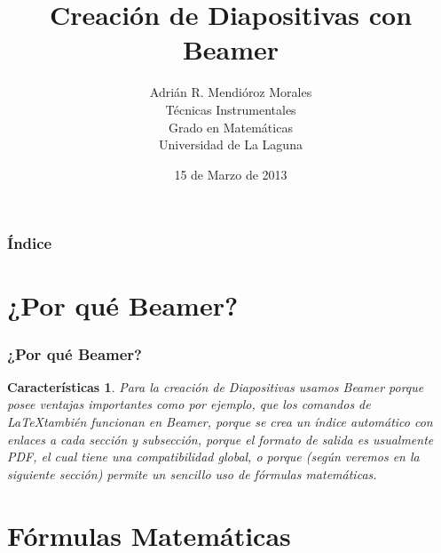 \documentclass{beamer}
\title[Beamer]{Creación de Diapositivas con Beamer}
\author[Adrián Mendióroz]{Adrián R. Mendióroz Morales\\
Técnicas Instrumentales\\
Grado en Matemáticas\\
Universidad de La Laguna}
\date[15-03-2013]{15 de Marzo de 2013}
\newtheorem{caracteristicas}{Características}
\begin{document}
\begin{frame}
 
\titlepage
 
\end{frame}

\begin{frame}
\frametitle{Índice}  
\tableofcontents[pausesections]
\end{frame}

\section{¿Por qué Beamer?}

\begin{frame}

\frametitle{¿Por qué Beamer?}

\begin{caracteristicas}

Para la creación de Diapositivas usamos Beamer porque posee ventajas importantes como por
ejemplo, que los comandos de \LaTeX también funcionan en Beamer, porque se crea un índice 
automático con enlaces a cada sección y subsección, porque el formato de salida es usualmente
PDF, el cual tiene una compatibilidad global, o porque (según veremos en la siguiente sección)
permite un sencillo uso de fórmulas matemáticas.

\end{caracteristicas}

\end{frame}

\section{Fórmulas Matemáticas}
\end{document}
